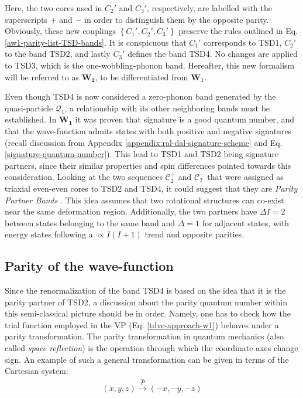 Here, the two cores used in $C_2'$ and $C_3'$, respectively, are labelled with the superscripts $+$ and $-$ in order to distinguish them by the opposite parity. Obviously, these new couplings $\left\{C_1',C_2',C_3'\right\}$ preserve the rules outlined in Eq. \ref{aw1-parity-list-TSD-bands}. It is conspicuous that $C_1'$ corresponds to TSD1, $C_2'$ to the band TSD2, and lastly $C_3'$ defines the band TSD4. No changes are applied to TSD3, which is the one-wobbling-phonon band. Hereafter, this new formalism will be referred to as $\mathbf{W_2}$, to be differentiated from $\mathbf{W_1}$.

Even though TSD4 is now considered a zero-phonon band generated by the quasi-particle $\mathcal{Q}_1$, a relationship with its other neighboring bands must be established. In $\mathbf{W_1}$ it was proven \cite{raduta2020approach} that signature is a good quantum number, and that the wave-function admits states with both positive and negative signatures (recall discussion from Appendix \ref{appendix:ral-dal-signature-scheme} and Eq. \ref{signature-quantum-number}). This lead to TSD1 and TSD2 being signature partners, since their similar properties and spin differences pointed towards this consideration. Looking at the two sequences $\mathscr{C}_2^+$ and $\mathscr{C}_2^-$ that were assigned as triaxial even-even cores to TSD2 and TSD4, it could suggest that they are \emph{Parity Partner Bands} \cite{poenaru2021parity}. This idea assumes that two rotational structures can co-exist near the same deformation region. Additionally, the two partners have $\Delta I=2$ between states belonging to the same band and $\Delta = 1$ for adjacent states, with energy states following a $\propto I(I+1)$ trend and opposite parities.

\subsection{Parity of the wave-function}

Since the renormalization of the band TSD4 is based on the idea that it is the parity partner of TSD2, a discussion about the parity quantum number within this semi-classical picture should be in order. Namely, one has to check how the trial function employed in the VP (Eq. \ref{tdve-approach-w1}) behaves under a parity transformation. The parity transformation in quantum mechanics (also called \emph{space reflection}) is the operation through which the coordinate axes change sign. An example of such a general transformation can be given in terms of the Cartesian system:
\begin{align}
    (x,y,z)\stackrel{\hat{P}}{\longrightarrow}(-x,-y,-z)
\end{align}

